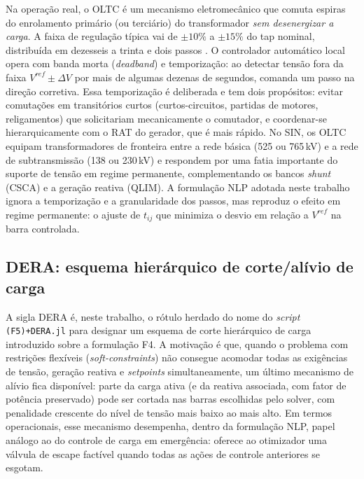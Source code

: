Na operação real, o OLTC é um mecanismo eletromecânico que comuta espiras do enrolamento primário (ou terciário) do transformador \emph{sem desenergizar a carga}. A faixa de regulação típica vai de $\pm 10\%$ a $\pm 15\%$ do tap nominal, distribuída em dezesseis a trinta e dois passos \cite{kundur1994stability}. O controlador automático local opera com banda morta (\textit{deadband}) e temporização: ao detectar tensão fora da faixa $V^{ref} \pm \Delta V$ por mais de algumas dezenas de segundos, comanda um passo na direção corretiva. Essa temporização é deliberada e tem dois propósitos: evitar comutações em transitórios curtos (curtos-circuitos, partidas de motores, religamentos) que solicitariam mecanicamente o comutador, e coordenar-se hierarquicamente com o RAT do gerador, que é mais rápido. No SIN, os OLTC equipam transformadores de fronteira entre a rede básica (525 ou 765\,kV) e a rede de subtransmissão (138 ou 230\,kV) e respondem por uma fatia importante do suporte de tensão em regime permanente, complementando os bancos \textit{shunt} (CSCA) e a geração reativa (QLIM). A formulação NLP adotada neste trabalho ignora a temporização e a granularidade dos passos, mas reproduz o efeito em regime permanente: o ajuste de $t_{ij}$ que minimiza o desvio em relação a $V^{ref}$ na barra controlada.

\subsection{DERA: esquema hierárquico de corte/alívio de carga}
\label{subsec:dera}

A sigla DERA é, neste trabalho, o rótulo herdado do nome do \textit{script} \texttt{(F5)+DERA.jl} para designar um esquema de corte hierárquico de carga introduzido sobre a formulação F4. A motivação é que, quando o problema com restrições flexíveis (\textit{soft-constraints}) não consegue acomodar todas as exigências de tensão, geração reativa e \textit{setpoints} simultaneamente, um último mecanismo de alívio fica disponível: parte da carga ativa (e da reativa associada, com fator de potência preservado) pode ser cortada nas barras escolhidas pelo solver, com penalidade crescente do nível de tensão mais baixo ao mais alto. Em termos operacionais, esse mecanismo desempenha, dentro da formulação NLP, papel análogo ao do controle de carga em emergência: oferece ao otimizador uma válvula de escape factível quando todas as ações de controle anteriores se esgotam.

